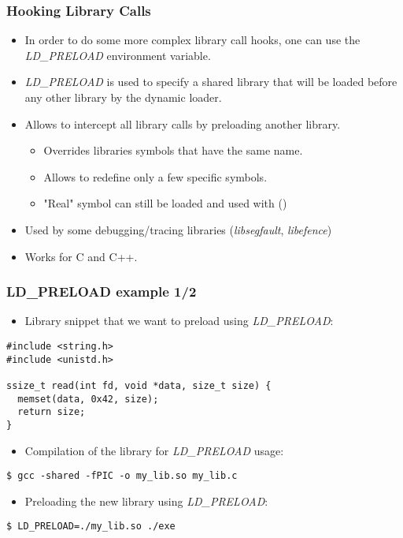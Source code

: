 \begin{frame}
  \frametitle{Hooking Library Calls}
  \begin{itemize}
    \item In order to do some more complex library call hooks, one can use
          the {\em LD\_PRELOAD} environment variable.
    \item {\em LD\_PRELOAD} is used to specify a shared library that will be
          loaded before any other library by the dynamic loader.
    \item Allows to intercept all library calls by preloading another library.
    \begin{itemize}
      \item Overrides libraries symbols that have the same name.
      \item Allows to redefine only a few specific symbols.
      \item "Real" symbol can still be loaded and used with  ()
    \end{itemize}
    \item Used by some debugging/tracing libraries ({\em libsegfault},
          {\em libefence})
    \item Works for C and C++.
  \end{itemize}
\end{frame}

\begin{frame}[fragile]
  \frametitle{LD\_PRELOAD example 1/2}
  \begin{itemize}
    \item Library snippet that we want to preload using {\em LD\_PRELOAD}:
  \end{itemize}
  \begin{block}{}
    \begin{verbatim}
#include <string.h>
#include <unistd.h>

ssize_t read(int fd, void *data, size_t size) {
  memset(data, 0x42, size);
  return size;
}
    \end{verbatim}
  \end{block}
  \begin{itemize}
    \item Compilation of the library for {\em LD\_PRELOAD} usage:
  \end{itemize}
  \begin{block}{}
    \begin{verbatim}
$ gcc -shared -fPIC -o my_lib.so my_lib.c
    \end{verbatim}
  \end{block}

  \begin{itemize}
    \item Preloading the new library using {\em LD\_PRELOAD}:
  \end{itemize}
  \begin{block}{}
    \begin{verbatim}
$ LD_PRELOAD=./my_lib.so ./exe
    \end{verbatim}
  \end{block}
\end{frame}

